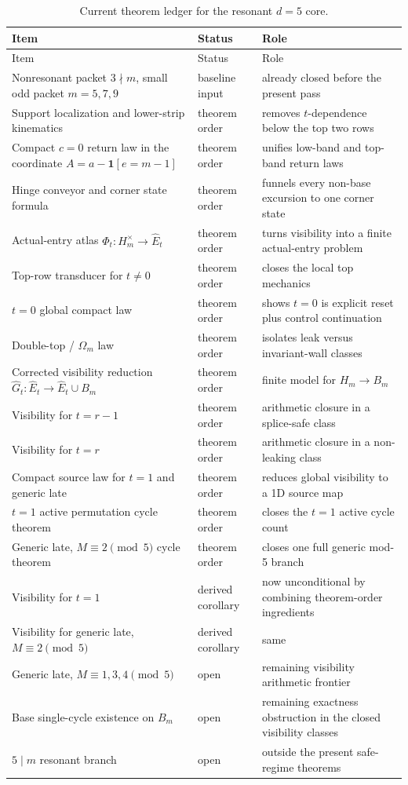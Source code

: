 \documentclass[11pt]{article}
\newcommand{\1}{\mathbf 1}
\newcommand{\Hm}{H_m}
\newcommand{\Bm}{B_m}
\newcommand{\Hmx}{H_m^\times}
\newcommand{\Em}{\widehat E_t}
\newcommand{\Gt}{\widehat G_t}
\begin{document}
\begin{longtable}{@{}p{}p{}p{}@{}}
\caption{Current theorem ledger for the resonant \(d=5\) core.}
\label{tab:ledger}\\
\toprule
Item & Status & Role \\
\midrule
\endfirsthead
\toprule
Item & Status & Role \\
\midrule
\endhead
Nonresonant packet \(3\nmid m\), small odd packet \(m=5,7,9\) & baseline input & already closed before the present pass \\
Support localization and lower-strip kinematics & theorem order & removes \(t\)-dependence below the top two rows \\
Compact \(c=0\) return law in the coordinate \(A=a-\1[e=m-1]\) & theorem order & unifies low-band and top-band return laws \\
Hinge conveyor and corner state formula & theorem order & funnels every non-base excursion to one corner state \\
Actual-entry atlas \(\Phi_t:\Hmx\to \Em\) & theorem order & turns visibility into a finite actual-entry problem \\
Top-row transducer for \(t\ne 0\) & theorem order & closes the local top mechanics \\
\(t=0\) global compact law & theorem order & shows \(t=0\) is explicit reset plus control continuation \\
Double-top / \(\Omega_m\) law & theorem order & isolates leak versus invariant-wall classes \\
Corrected visibility reduction \(\Gt:\Em\to \Em\cup\Bm\) & theorem order & finite model for \(\Hm\to\Bm\) \\
Visibility for \(t=r-1\) & theorem order & arithmetic closure in a splice-safe class \\
Visibility for \(t=r\) & theorem order & arithmetic closure in a non-leaking class \\
Compact source law for \(t=1\) and generic late & theorem order & reduces global visibility to a 1D source map \\
\(t=1\) active permutation cycle theorem & theorem order & closes the \(t=1\) active cycle count \\
Generic late, \(M\equiv 2\pmod 5\) cycle theorem & theorem order & closes one full generic mod-5 branch \\
Visibility for \(t=1\) & derived corollary & now unconditional by combining theorem-order ingredients \\
Visibility for generic late, \(M\equiv 2\pmod 5\) & derived corollary & same \\
Generic late, \(M\equiv 1,3,4\pmod 5\) & open & remaining visibility arithmetic frontier \\
Base single-cycle existence on \(\Bm\) & open & remaining exactness obstruction in the closed visibility classes \\
\(5\mid m\) resonant branch & open & outside the present safe-regime theorems \\
\bottomrule
\end{longtable}
\end{document}
